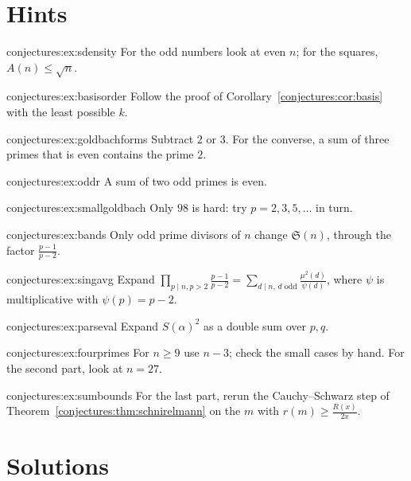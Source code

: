 \section{Hints}

\begin{hint}{conjectures:ex:sdensity}
For the odd numbers look at even $n$; for the squares, $A(n)\le\sqrt n$.
\end{hint}
\begin{hint}{conjectures:ex:basisorder}
Follow the proof of Corollary~\ref{conjectures:cor:basis} with the least possible $k$.
\end{hint}
\begin{hint}{conjectures:ex:goldbachforms}
Subtract $2$ or $3$. For the converse, a sum of three primes that is even contains the prime $2$.
\end{hint}
\begin{hint}{conjectures:ex:oddr}
A sum of two odd primes is even.
\end{hint}
\begin{hint}{conjectures:ex:smallgoldbach}
Only $98$ is hard: try $p=2,3,5,\dots$ in turn.
\end{hint}
\begin{hint}{conjectures:ex:bands}
Only odd prime divisors of $n$ change $\mathfrak S(n)$, through the factor $\frac{p-1}{p-2}$.
\end{hint}
\begin{hint}{conjectures:ex:singavg}
Expand $\prod_{p\mid n,p>2}\frac{p-1}{p-2}=\sum_{d\mid n,\,d\text{ odd}}\frac{\mu^2(d)}{\psi(d)}$, where $\psi$ is multiplicative with $\psi(p)=p-2$.
\end{hint}
\begin{hint}{conjectures:ex:parseval}
Expand $S(\alpha)^2$ as a double sum over $p,q$.
\end{hint}
\begin{hint}{conjectures:ex:fourprimes}
For $n\ge9$ use $n-3$; check the small cases by hand. For the second part, look at $n=27$.
\end{hint}
\begin{hint}{conjectures:ex:sumbounds}
For the last part, rerun the Cauchy--Schwarz step of Theorem~\ref{conjectures:thm:schnirelmann} on the $m$ with $r(m)\ge\frac{R(x)}{2x}$.
\end{hint}

\section{Solutions}


